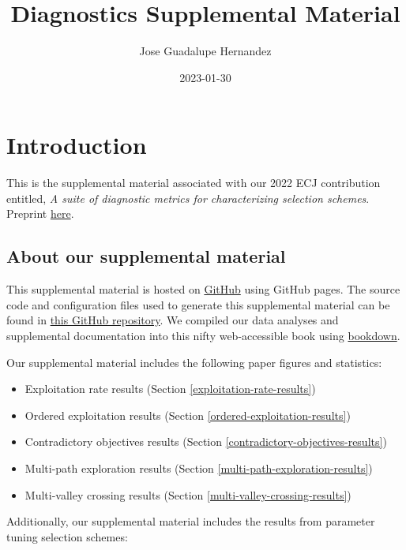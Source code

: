 \documentclass[]{book}
\title{Diagnostics Supplemental Material}
\author{Jose Guadalupe Hernandez}
\date{2023-01-30}
\providecommand{\tightlist}{%
  \setlength{\itemsep}{0pt}\setlength{\parskip}{0pt}}
\begin{document}
\maketitle

{
\setcounter{tocdepth}{1}
\tableofcontents
}
\hypertarget{introduction}{%
\chapter{Introduction}\label{introduction}}

This is the supplemental material associated with our 2022 ECJ contribution entitled, \emph{A suite of diagnostic metrics for characterizing selection schemes}.
Preprint \href{https://arxiv.org/pdf/2204.13839.pdf}{here}.

\hypertarget{about-our-supplemental-material}{%
\section{About our supplemental material}\label{about-our-supplemental-material}}

This supplemental material is hosted on \href{https://github.com}{GitHub} using GitHub pages.
The source code and configuration files used to generate this supplemental material can be found in \href{https://github.com/jgh9094/ECJ-2022-suite-of-diagnostics-for-selection-schemes}{this GitHub repository}.
We compiled our data analyses and supplemental documentation into this nifty web-accessible book using \href{https://bookdown.org/}{bookdown}.

Our supplemental material includes the following paper figures and statistics:

\begin{itemize}
\tightlist
\item
  Exploitation rate results (Section \ref{exploitation-rate-results})
\item
  Ordered exploitation results (Section \ref{ordered-exploitation-results})
\item
  Contradictory objectives results (Section \ref{contradictory-objectives-results})
\item
  Multi-path exploration results (Section \ref{multi-path-exploration-results})
\item
  Multi-valley crossing results (Section \ref{multi-valley-crossing-results})
\end{itemize}

Additionally, our supplemental material includes the results from parameter tuning selection schemes:
\end{document}
